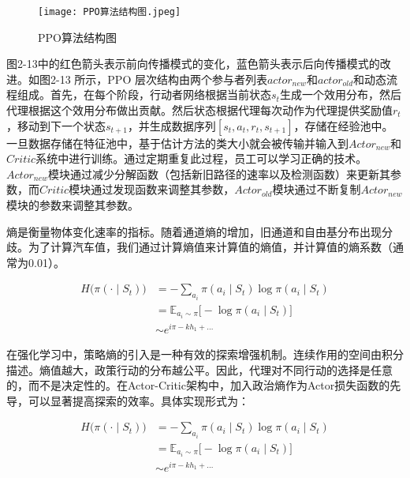 \begin{figure}[hbt]
	\centering
	\texttt{[image: PPO算法结构图.jpeg]}
	\caption{PPO算法结构图}
	\label{f.example}
\end{figure}

图2-13中的红色箭头表示前向传播模式的变化，蓝色箭头表示后向传播模式的改进。如图2-13 所示，PPO 层次结构由两个参与者列表$actor_{new}$和$actor_{old}$和动态流程组成。首先，在每个阶段，行动者网络根据当前状态$s_t$生成一个效用分布，然后代理根据这个效用分布做出贡献。然后状态根据代理每次动作为代理提供奖励值$r_t$，移动到下一个状态$s_{t+1}$，并生成数据序列$[s_t,a_t,r_t,s_{t+1}]$，存储在经验池中。一旦数据存储在特征池中，基于估计方法的类大小就会被传输并输入到$Actor_{new}$和$Critic$系统中进行训练。通过定期重复此过程，员工可以学习正确的技术。$Actor_{new}$模块通过减少分解函数（包括新旧路径的速率以及检测函数）来更新其参数，而$Critic$模块通过发现函数来调整其参数，$Actor_{old}$模块通过不断复制$Actor_{new}$模块的参数来调整其参数。


熵是衡量物体变化速率的指标。随着通道熵的增加，旧通道和自由基分布出现分歧。为了计算汽车值，我们通过计算熵值\cite{tucker2018mirage}来计算值的熵值，并计算值的熵系数（通常为0.01）。

\begin{align}
	H\big(\pi(\cdot \mid S_t)\big) &= -\sum_{a_i} \pi(a_i \mid S_t) \log \pi(a_i \mid S_t) \\
	&= \mathbb{E}_{a_i \sim \pi} \Big[ -\log \pi(a_i \mid S_t) \Big] \\
	&\sim e^{i\pi - k h_1 + \dots}
\end{align}

在强化学习中，策略熵的引入是一种有效的探索增强机制。连续作用的空间由积分描述。熵值越大，政策行动的分布越公平。因此，代理对不同行动的选择是任意的，而不是决定性的。在Actor-Critic架构中，加入政治熵作为Actor损失函数的先导，可以显著提高探索的效率。具体实现形式为：

\begin{align}
	H\big(\pi(\cdot \mid S_t)\big) &= -\sum_{a_i} \pi(a_i \mid S_t) \log \pi(a_i \mid S_t) \\
	&= \mathbb{E}_{a_i \sim \pi} \Big[ -\log \pi(a_i \mid S_t) \Big] \\
	&\sim e^{i\pi - k h_1 + \dots}
\end{align}

